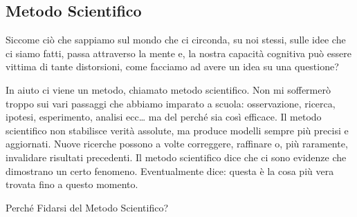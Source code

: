 \documentclass[12pt]{book} %
\begin{document}
\subsection{Metodo Scientifico}
Siccome ciò che sappiamo sul mondo che ci circonda, su noi stessi, sulle idee che ci siamo fatti, passa attraverso
la mente e, la nostra capacità cognitiva può essere vittima di tante distorsioni, come facciamo ad avere un idea su una
questione?

In aiuto ci viene un metodo, chiamato metodo scientifico. Non mi soffermerò troppo sui vari passaggi che abbiamo
imparato a scuola: osservazione, ricerca, ipotesi, esperimento, analisi ecc… ma del perché sia così efficace. Il metodo scientifico non stabilisce verità assolute, ma produce modelli sempre più precisi e aggiornati. Nuove ricerche possono a volte correggere, raffinare o, più raramente, invalidare risultati precedenti. Il metodo scientifico dice che ci sono evidenze che
dimostrano un certo fenomeno. Eventualmente dice: questa è la cosa più vera trovata fino a questo momento.

Perché Fidarsi del Metodo Scientifico? 
\end{document}
